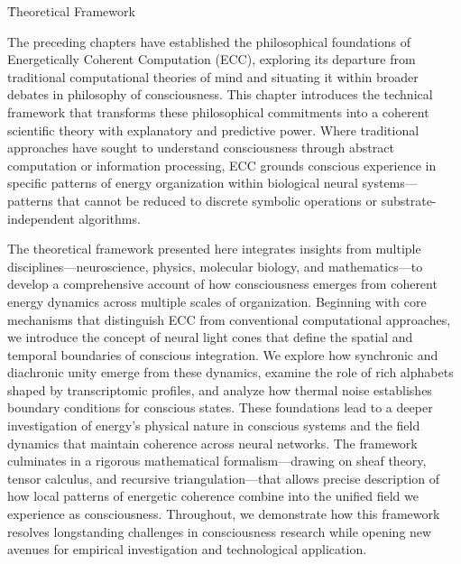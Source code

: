 \h{Theoretical Framework}

\begin{refsection}

The preceding chapters have established the philosophical foundations of Energetically Coherent Computation (ECC), exploring its departure from traditional computational theories of mind and situating it within broader debates in philosophy of consciousness. This chapter introduces the technical framework that transforms these philosophical commitments into a coherent scientific theory with explanatory and predictive power. Where traditional approaches have sought to understand consciousness through abstract computation or information processing, ECC grounds conscious experience in specific patterns of energy organization within biological neural systems—patterns that cannot be reduced to discrete symbolic operations or substrate-independent algorithms.

The theoretical framework presented here integrates insights from multiple disciplines—neuroscience, physics, molecular biology, and mathematics—to develop a comprehensive account of how consciousness emerges from coherent energy dynamics across multiple scales of organization. Beginning with core mechanisms that distinguish ECC from conventional computational approaches, we introduce the concept of neural light cones that define the spatial and temporal boundaries of conscious integration. We explore how synchronic and diachronic unity emerge from these dynamics, examine the role of rich alphabets shaped by transcriptomic profiles, and analyze how thermal noise establishes boundary conditions for conscious states. These foundations lead to a deeper investigation of energy's physical nature in conscious systems and the field dynamics that maintain coherence across neural networks. The framework culminates in a rigorous mathematical formalism—drawing on sheaf theory, tensor calculus, and recursive triangulation—that allows precise description of how local patterns of energetic coherence combine into the unified field we experience as consciousness. Throughout, we demonstrate how this framework resolves longstanding challenges in consciousness research while opening new avenues for empirical investigation and technological application.






\end{refsection}

